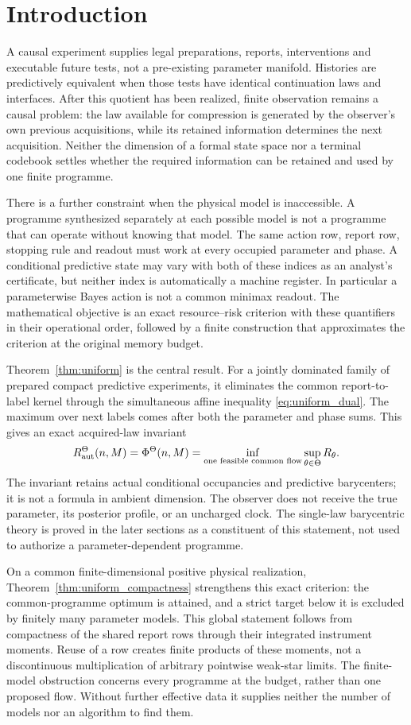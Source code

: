 \section{Introduction}\label{sec:introduction}
A causal experiment supplies legal preparations, reports, interventions and executable future tests, not a pre-existing parameter manifold. Histories are predictively equivalent when those tests have identical continuation laws and interfaces. After this quotient has been realized, finite observation remains a causal problem: the law available for compression is generated by the observer's own previous acquisitions, while its retained information determines the next acquisition. Neither the dimension of a formal state space nor a terminal codebook settles whether the required information can be retained and used by one finite programme.

There is a further constraint when the physical model is inaccessible. A programme synthesized separately at each possible model is not a programme that can operate without knowing that model. The same action row, report row, stopping rule and readout must work at every occupied parameter and phase. A conditional predictive state may vary with both of these indices as an analyst's certificate, but neither index is automatically a machine register. In particular a parameterwise Bayes action is not a common minimax readout. The mathematical objective is an exact resource--risk criterion with these quantifiers in their operational order, followed by a finite construction that approximates the criterion at the original memory budget.

Theorem~\ref{thm:uniform} is the central result. For a jointly dominated family of prepared compact predictive experiments, it eliminates the common report-to-label kernel through the simultaneous affine inequality \eqref{eq:uniform_dual}. The maximum over next labels comes after both the parameter and phase sums. This gives an exact acquired-law invariant
\[
 R^\Theta_{\mathrm{aut}}(n,M)=\Phi^\Theta(n,M)
     =\inf_{\text{one feasible common flow}}\sup_{\theta\in\Theta}R_\theta.
\]
The invariant retains actual conditional occupancies and predictive barycenters; it is not a formula in ambient dimension. The observer does not receive the true parameter, its posterior profile, or an uncharged clock. The single-law barycentric theory is proved in the later sections as a constituent of this statement, not used to authorize a parameter-dependent programme.

On a common finite-dimensional positive physical realization, Theorem~\ref{thm:uniform_compactness} strengthens this exact criterion: the common-programme optimum is attained, and a strict target below it is excluded by finitely many parameter models. This global statement follows from compactness of the shared report rows through their integrated instrument moments. Reuse of a row creates finite products of these moments, not a discontinuous multiplication of arbitrary pointwise weak-star limits. The finite-model obstruction concerns every programme at the budget, rather than one proposed flow. Without further effective data it supplies neither the number of models nor an algorithm to find them.

